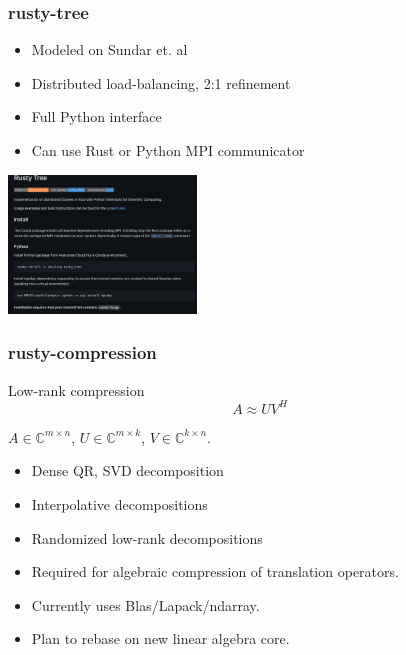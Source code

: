 \documentclass[dvipsnames,10pt]{beamer}
\begin{document}
\begin{frame}
\frametitle{rusty-tree}

\begin{minipage}{5cm}
\begin{itemize}
\item Modeled on Sundar et. al\footnotemark
\item Distributed load-balancing, 2:1 refinement
\item Full Python interface
\item Can use Rust or Python MPI communicator
\end{itemize}
\end{minipage}
\begin{minipage}{5cm}
\includegraphics[width=5cm]{../figs/rusty_tree}
\end{minipage}


\end{frame}

\begin{frame}
\frametitle{rusty-compression}
\begin{minipage}{5cm}

\begin{tcolorbox}
Low-rank compression
$$
A\approx UV^H
$$

$A\in\mathbb{C}^{m\times n}$, $U\in\mathbb{C}^{m\times k}$, $V\in\mathbb{C}^{k\times n}$.
\end{tcolorbox}
\end{minipage}
\begin{minipage}{5cm}
\begin{itemize}
\item Dense QR, SVD decomposition
\item Interpolative decompositions
\item Randomized low-rank decompositions
\end{itemize}
\end{minipage}

\vspace{2\baselineskip}

\begin{itemize}
\item Required for algebraic compression of translation operators.
\item Currently uses Blas/Lapack/ndarray.
\item Plan to rebase on new linear algebra core.
\end{itemize}
\end{frame}
\end{document}
